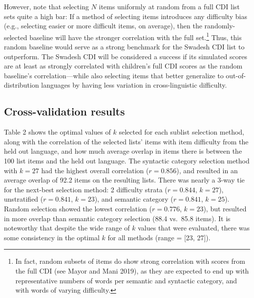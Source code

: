 \documentclass[
  letterpaper,
  DIV=11,
  numbers=noendperiod]{scrartcl}
\begin{document}
However, note that selecting \(N\) items uniformly at random from a full
CDI list sets quite a high bar: If a method of selecting items
introduces any difficulty bias (e.g., selecting easier or more difficult
items, on average), then the randomly-selected baseline will have the
stronger correlation with the full set.\footnote{In fact, random subsets
  of items do show strong correlation with scores from the full CDI (see
  Mayor and Mani 2019), as they are expected to end up with
  representative numbers of words per semantic and syntactic category,
  and with words of varying difficulty.} Thus, this random baseline
would serve as a strong benchmark for the Swadesh CDI list to
outperform. The Swadesh CDI will be considered a success if its
simulated scores are at least as strongly correlated with children's
full CDI scores as the random baseline's correlation---while also
selecting items that better generalize to out-of-distribution languages
by having less variation in cross-linguistic difficulty.

\subsection{Cross-validation results}\label{cross-validation-results}

Table 2 shows the optimal values of \(k\) selected for each sublist
selection method, along with the correlation of the selected lists'
items with item difficulty from the held out language, and how much
average overlap in items there is between the 100 list items and the
held out language. The syntactic category selection method with \(k=27\)
had the highest overall correlation (\(r=0.856\)), and resulted in an
average overlap of 92.2 items on the resulting lists. There was nearly a
3-way tie for the next-best selection method: 2 difficulty strata
(\(r=0.844\), \(k=27\)), unstratified (\(r=0.841\), \(k=23\)), and
semantic category (\(r=0.841\), \(k=25\)). Random selection showed the
lowest correlation (\(r=0.776\), \(k=23\)), but resulted in more overlap
than semantic category selection (88.4 vs.~85.8 items). It is noteworthy
that despite the wide range of \(k\) values that were evaluated, there
was some consistency in the optimal \(k\) for all methods (range =
{[}23, 27{]}).
\end{document}
